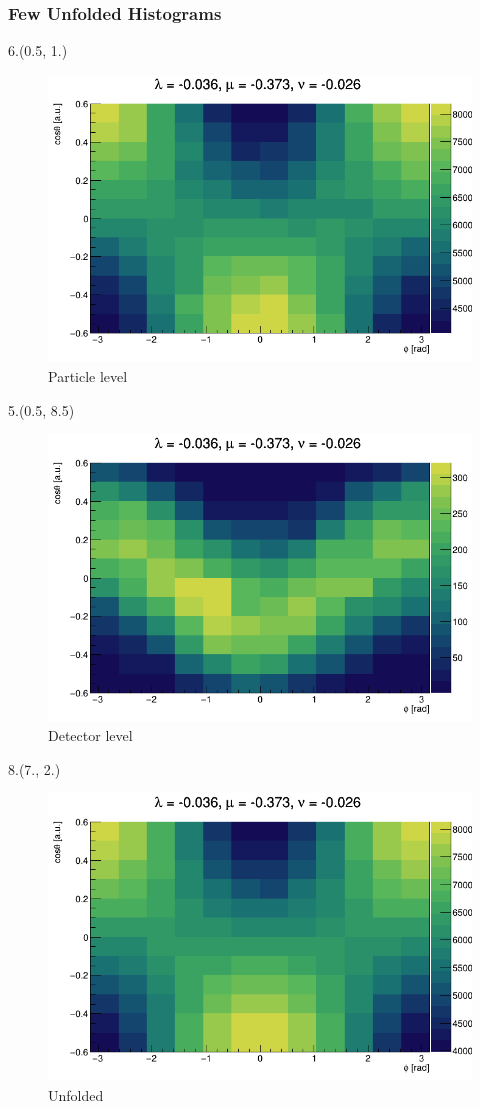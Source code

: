 \documentclass[12pt, xcolor={dvipsnames}, aspectratio = 169, sans, mathserif]{beamer}
\newenvironment{Pic}[2]
{\begin{textblock}{#1}#2
\begin{figure}}
{\end{figure}
\end{textblock}}
\begin{document}
\begin{frame}
\frametitle{Few Unfolded Histograms}

\begin{Pic}{6.}{(0.5, 1.)}
  \caption{Particle level}
  \includegraphics[width=6.cm]{imgs/true_fit_1.png}
\end{Pic}

\begin{Pic}{5.}{(0.5, 8.5)}
  \caption{Detector level}
  \includegraphics[width=5.cm]{imgs/reco_fit_1.png}
\end{Pic}

\begin{Pic}{8.}{(7., 2.)}
  \caption{Unfolded}
  \includegraphics[width=8.cm]{imgs/pred_fit_1.png}
\end{Pic}
\end{frame}
\end{document}

